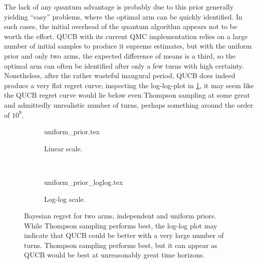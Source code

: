 The lack of any quantum advantage is probably due to this prior generally yielding \enquote{easy} problems, where the optimal arm can be quickly identified.
In such cases, the initial overhead of the quantum algorithm appears not to be worth the effort.
QUCB with its current QMC implementation relies on a large number of initial samples to produce it supreme estimates, but with the uniform prior and only two arms, the expected difference of means is a third, so the optimal arm can often be identified after only a few turns with high certainty.
Nonetheless, after the rather wasteful inaugural period, QUCB does indeed produce a very flat regret curve; inspecting the log-log-plot in \cref{fig:random}, it may seem like the QUCB regret curve would lie below even Thompson sampling at some great and admittedly unrealistic number of turns, perhaps something around the order of $10^{9}$.



\begin{figure}
    \centering
    \begin{subfigure}{\textwidth}
        \centering
        \newcommand{\myoptions}{
            width=10cm,
            height=8cm,
            xlabel={Kiloturn},
            ylabel={Regret},
            legend entries={UCB, QUCB, Thompson},
            legend pos=north west,
            legend cell align=left,
            mystyle,
            ymax = 150,
        }
        {uniform_prior.tex}
        \caption{Linear scale.}
    \end{subfigure}
    \\[3ex]
    \begin{subfigure}{\textwidth}
        \centering
        \newcommand{\myoptions}{
            width=10cm,
            height=8cm,
            xlabel={Turn},
            ylabel={Regret},
            legend entries={UCB, QUCB, Thompson},
            legend pos=north west,
            legend cell align=left,
            mystyle,
        }
        {uniform_prior_loglog.tex}
        \caption{Log-log scale.}
    \end{subfigure}
    \caption[
        Bayesian regret for two arms, independent and uniform priors.
    ]
    {
        Bayesian regret for two arms, independent and uniform priors.
        While Thompson sampling performs best, the log-log plot may indicate that QUCB could be better with a very large number of turns.
        Thompson sampling performs best, but it can appear as QUCB would be best at unreasonably great time horizons.
    }
    \label{fig:random}
\end{figure}


